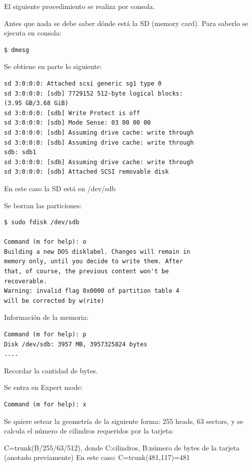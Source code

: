 
El siguiente procedimiento se realiza por consola.

\bigskip
Antes que nada se debe saber dónde está la SD (memory card).
Para saberlo se ejecuta en consola: 

\begin{verbatim}
$ dmesg
\end{verbatim}

Se obtiene en parte lo siguiente: 
\begin{verbatim}
sd 3:0:0:0: Attached scsi generic sg1 type 0 
sd 3:0:0:0: [sdb] 7729152 512-byte logical blocks: 
(3.95 GB/3.68 GiB) 
sd 3:0:0:0: [sdb] Write Protect is off 
sd 3:0:0:0: [sdb] Mode Sense: 03 00 00 00 
sd 3:0:0:0: [sdb] Assuming drive cache: write through 
sd 3:0:0:0: [sdb] Assuming drive cache: write through 
sdb: sdb1 
sd 3:0:0:0: [sdb] Assuming drive cache: write through 
sd 3:0:0:0: [sdb] Attached SCSI removable disk 
\end{verbatim}

En este caso la SD está en /dev/sdb 

\bigskip
Se borran las particiones: 

\begin{verbatim}
$ sudo fdisk /dev/sdb

Command (m for help): o 
Building a new DOS disklabel. Changes will remain in 
memory only, until you decide to write them. After 
that, of course, the previous content won't be 
recoverable. 
Warning: invalid flag 0x0000 of partition table 4 
will be corrected by w(rite) 
\end{verbatim}

Información de la memoria: 

\begin{verbatim}
Command (m for help): p 
Disk /dev/sdb: 3957 MB, 3957325824 bytes 
.... 
\end{verbatim}

Recordar la cantidad de bytes.

\newpage
Se entra en Expert mode: 

\bigskip
\begin{verbatim}
Command (m for help): x 
\end{verbatim}

Se quiere setear la geometría de la siguiente forma: 255 heads, 63 sectors, y se calcula el 
número de cilindros requeridos por la tarjeta: 

\bigskip
C=trunk(B/255/63/512), donde C:cilindros, B:número de bytes de la tarjeta (anotado previamente) 
En este caso: C=trunk(481,117)=481 


